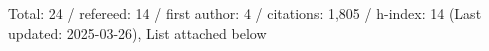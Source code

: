 Total: 24 / refereed: 14 / first author: 4 / citations: 1,805 / h-index: 14 (Last updated: 2025-03-26), List attached below